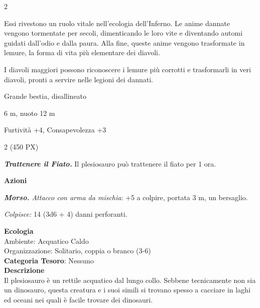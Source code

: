 \begin{multicols}{2}
{Essi rivestono un ruolo vitale nell'ecologia dell'Inferno. Le anime dannate vengono tormentate per secoli, dimenticando le loro vite e diventando automi guidati dall'odio e dalla paura. Alla fine, queste anime vengono trasformate in lemure, la forma di vita più elementare dei diavoli.

I diavoli maggiori possono riconoscere i lemure più corrotti e trasformarli in veri diavoli, pronti a servire nelle legioni dei dannati.

\begin{description}[noitemsep, topsep=0pt, parsep=0pt, partopsep=0pt, itemsep=1pt, leftmargin=2.35cm,  labelwidth=2.2cm, itemindent=0cm, listparindent=0pt] %
\setlength{\baselineskip}{10pt}
\item[\textbf{Taglia/Tipo}] Grande bestia, disallineato
\item[\textbf{Caratt.}] 
\item[\textbf{Punti Ferita}] 
\item[\textbf{Movimento}] 6 m, nuoto 12 m
\item[\textbf{Tiri Salvez.}] 
\item[\textbf{Comp.}] Furtività +4, Consapevolezza +3
\item[\textbf{Sfida}] 2 (450 PX)
\end{description}
\smallskip

\emph{\textbf{Trattenere il Fiato.}} Il plesiosauro può trattenere il fiato per 1 ora.

\textbf{Azioni}

\emph{\textbf{Morso.} Attacco con arma da mischia}: +5 a colpire, portata 3 m, un bersaglio.

\emph{Colpisce:} 14 (3d6 + 4) danni perforanti.

\textbf{Ecologia}\\
Ambiente: Acquatico Caldo\\
Organizzazione: Solitario, coppia o branco (3-6)\\
\textbf{Categoria Tesoro}: Nessuno\\
\textbf{Descrizione}\\
Il plesiosauro è un rettile acquatico dal lungo collo. Sebbene tecnicamente non sia un dinosauro, questa creatura e i suoi simili si trovano spesso a cacciare in laghi ed oceani nei quali è facile trovare dei dinosauri.

}
\end{multicols}
